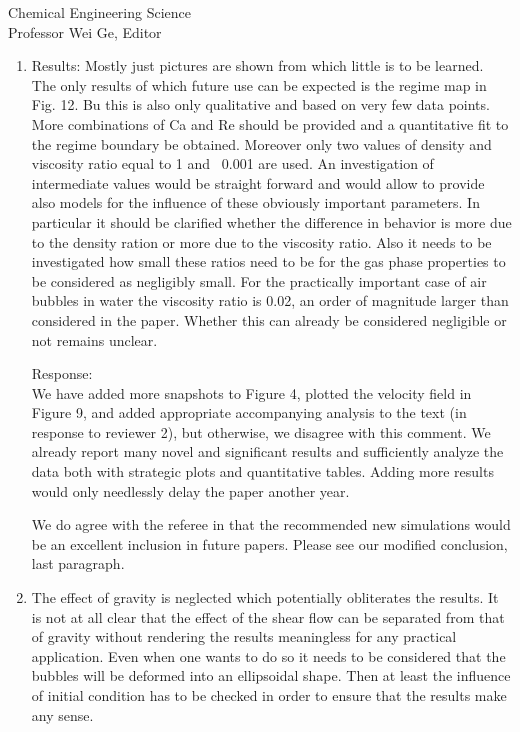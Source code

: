 \documentclass{letter}
\begin{document}
\begin{letter}{
Chemical Engineering Science\\
Professor Wei Ge, Editor\\}
\begin{enumerate}
\par\noindent
\item
\textsf
{Results: Mostly just pictures are shown from which little is to be learned. The only results of which future use can be expected is the regime map in Fig. 12. Bu this is also only qualitative and based on very few data points. More combinations of Ca and Re should be provided and a quantitative fit to the regime boundary be obtained. Moreover only two values of density and viscosity ratio equal to 1 and ~0.001 are used. An investigation of intermediate values would be straight forward and would allow to provide also models for the influence of these obviously important parameters. In particular it should be clarified whether the difference in behavior is more due to the density ration or more due to the viscosity ratio. Also it needs to be investigated how small these ratios need to be for the gas phase properties to be considered as negligibly small. For the practically important case of air bubbles in water the viscosity ratio is 0.02, an order of magnitude larger than considered in the paper. Whether this can already be considered negligible or not remains unclear.}
\vspace{3 mm}

Response: \\
We have added more snapshots to Figure 4, plotted the velocity field in Figure 9,  and added appropriate accompanying analysis to the text (in response to reviewer 2), but otherwise, we disagree with this comment.  We already report many novel and significant results and sufficiently analyze the data both with strategic plots and quantitative tables.  Adding more results would only needlessly delay the paper another year.  
\par
We do agree with the referee in that the recommended new simulations would be an excellent inclusion in future papers.  Please see our modified conclusion, last paragraph.

\par\noindent
\item
\textsf
{The effect of gravity is neglected which potentially obliterates the results. It is not at all clear that the effect of the shear flow can be separated from that of gravity without rendering the results meaningless for any practical application. Even when one wants to do so it needs to be considered that the bubbles will be deformed into an ellipsoidal shape. Then at least the influence of initial condition has to be checked in order to ensure that the results make any sense. \\}
\vspace{3 mm}


\end{enumerate}
\end{letter}
\end{document}
